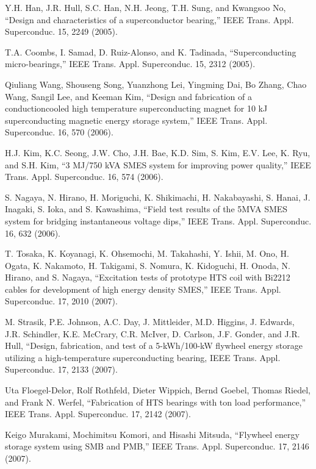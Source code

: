 \noindent [9.97] Y.H. Han, J.R. Hull, S.C. Han, N.H. Jeong, T.H. Sung, and Kwangsoo No, ``Design
and characteristics of a superconductor bearing,” IEEE Trans. Appl. Superconduc.
15, 2249 (2005).

\noindent [9.98] T.A. Coombs, I. Samad, D. Ruiz-Alonso, and K. Tadinada, ``Superconducting
micro-bearings,” IEEE Trans. Appl. Superconduc. 15, 2312 (2005).

\noindent [9.99] Qiuliang Wang, Shouseng Song, Yuanzhong Lei, Yingming Dai, Bo Zhang, Chao
Wang, Sangil Lee, and Keeman Kim, ``Design and fabrication of a conductioncooled
high temperature superconducting magnet for 10 kJ superconducting magnetic
energy storage system,” IEEE Trans. Appl. Superconduc. 16, 570 (2006).

\noindent [9.100] H.J. Kim, K.C. Seong, J.W. Cho, J.H. Bae, K.D. Sim, S. Kim, E.V. Lee, K. Ryu,
and S.H. Kim, ``3 MJ/750 kVA SMES system for improving power quality,” IEEE
Trans. Appl. Superconduc. 16, 574 (2006).

\noindent [9.101] S. Nagaya, N. Hirano, H. Moriguchi, K. Shikimachi, H. Nakabayashi, S. Hanai,
J. Inagaki, S. Ioka, and S. Kawashima, ``Field test results of the 5MVA SMES
system for bridging instantaneous voltage dips,” IEEE Trans. Appl. Superconduc.
16, 632 (2006).

\noindent [9.102] T. Tosaka, K. Koyanagi, K. Ohsemochi, M. Takahashi, Y. Ishii, M. Ono, H. Ogata,
K. Nakamoto, H. Takigami, S. Nomura, K. Kidoguchi, H. Onoda, N. Hirano,
and S. Nagaya, ``Excitation tests of prototype HTS coil with Bi2212 cables for
development of high energy density SMES,” IEEE Trans. Appl. Superconduc.
17, 2010 (2007).

\noindent [9.103] M. Strasik, P.E. Johnson, A.C. Day, J. Mittleider, M.D. Higgins, J. Edwards, J.R.
Schindler, K.E. McCrary, C.R. McIver, D. Carlson, J.F. Gonder, and J.R. Hull,
``Design, fabrication, and test of a 5-kWh/100-kW flywheel energy storage utilizing
a high-temperature superconducting bearing, IEEE Trans. Appl. Superconduc.
17, 2133 (2007).

\noindent [9.104] Uta Floegel-Delor, Rolf Rothfeld, Dieter Wippich, Bernd Goebel, Thomas Riedel,
and Frank N. Werfel, ``Fabrication of HTS bearings with ton load performance,”
IEEE Trans. Appl. Superconduc. 17, 2142 (2007).

\noindent [9.105] Keigo Murakami, Mochimitsu Komori, and Hisashi Mitsuda, ``Flywheel energy
storage system using SMB and PMB,” IEEE Trans. Appl. Superconduc. 17, 2146
(2007).

